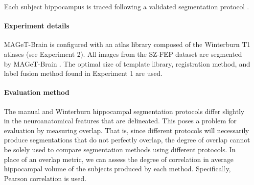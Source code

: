 \documentclass{article}\usepackage{graphicx, color}
\newcommand{\mb}{MAGeT-Brain }
\newcommand{\FEPdataset}{SZ-FEP }
\begin{document}
Each subject hippocampus is traced following a validated segmentation protocol 
\citep{Pruessner2000}. 

\paragraph{Experiment details} 
\mb is configured with an atlas library composed of the Winterburn T1 atlases
(see Experiment 2).  All images from the \FEPdataset dataset are segmented by \mb.  The 
optimal size of template library, registration method, and label fusion method 
found in Experiment 1 are used. 

\paragraph{Evaluation method}
The manual and Winterburn hippocampal segmentation protocols differ slightly in
the neuroanatomical features that are delineated.  This poses a problem for
evaluation by measuring overlap.  That is, since different protocols will
necessarily produce segmentations that do not perfectly overlap, the degree of
overlap cannot be solely used to compare segmentation methods using different
protocols. In place of an overlap metric, we can assess the degree of correlation in
average hippocampal volume of the subjects produced by each method.
Specifically, Pearson correlation is used. 
\end{document}
